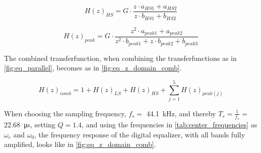     \startexplain
    \stopexplain
    
\begin{equation}\label{eq:Hz_HS}
        H(z)_{HS} = G \cdot \frac{z \cdot a_{HS1} + a_{HS2}}{z \cdot b_{HS1} + b_{HS2}}
    \end{equation}
    
    \startexplain
    \stopexplain

\begin{equation}\label{eq:Hz_peak}
        H(z)_{peak} = G \cdot \frac{z^2 \cdot a_{peak1} + a_{peak2}}{z^2 \cdot b_{peak1} + z \cdot b_{peak2} + b_{peak3}}
    \end{equation}
    
    \startexplain
    \stopexplain

The combined transferfunction, when combining the transferfunctions as in \autoref{fig:eq_parallel}, becomes as in \autoref{fig:eq_z_domain_comb}.

\begin{equation}\label{eq:z_to_n_final}
        H(z)_{comb} = 1 + H(z)_{LS} + H(z)_{HS} +  \sum_{j=1}^{5} H(z)_{peak(j)}
    \end{equation}

When choosing the sampling frequency, $f_s =$ \SI{44.1}{\kilo \hertz}, and thereby $T_s = \frac{1}{f_s} =$ \SI{22.68}{\micro \second}, setting $Q = 1.4$, and using the frequencies in \autoref{tab:center_frequencies} as $\omega_c$ and $\omega_0$, the frequency response of the digital equalizer, with all bands fully amplified, looks like in \autoref{fig:eq_z_domain_comb}.

